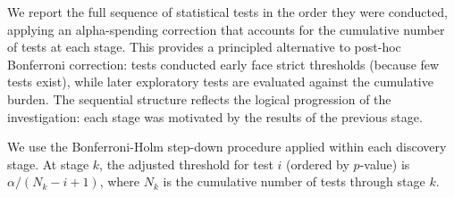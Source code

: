 \documentclass{article}
\begin{document}
We report the full sequence of statistical tests in the order they were conducted, applying an alpha-spending correction that accounts for the cumulative number of tests at each stage. This provides a principled alternative to post-hoc Bonferroni correction: tests conducted early face strict thresholds (because few tests exist), while later exploratory tests are evaluated against the cumulative burden. The sequential structure reflects the logical progression of the investigation: each stage was motivated by the results of the previous stage.

We use the Bonferroni-Holm step-down procedure applied within each discovery stage. At stage $k$, the adjusted threshold for test $i$ (ordered by $p$-value) is $\alpha / (N_k - i + 1)$, where $N_k$ is the cumulative number of tests through stage $k$.
\end{document}
